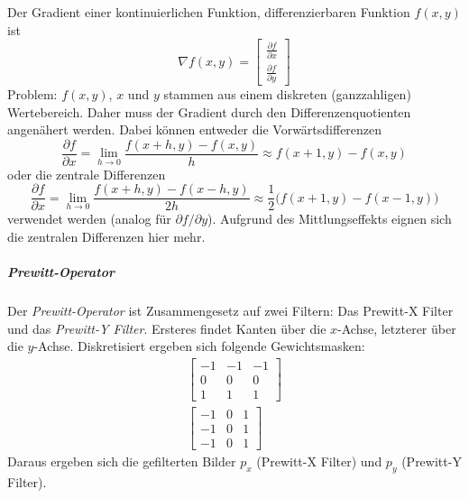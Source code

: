 \documentclass[a4paper, 11pt, accentcolor = tud3b]{tudreport}
\begin{document}
						Der Gradient einer kontinuierlichen Funktion, differenzierbaren Funktion \( f(x, y) \) ist
						\begin{equation*}
							\nabla f(x, y) =
								\begin{bmatrix}
									\frac{\partial f}{\partial x} \\
									\frac{\partial f}{\partial y}
								\end{bmatrix}
						\end{equation*}
						Problem: \( f(x, y) \), \(x\) und \(y\) stammen aus einem diskreten (ganzzahligen) Wertebereich. Daher muss der Gradient durch den Differenzenquotienten angenähert werden. Dabei können entweder die Vorwärtsdifferenzen
						\begin{equation*}
							\frac{\partial f}{\partial x} = \lim\limits_{h \to 0} \frac{f(x + h, y) - f(x, y)}{h} \approx f(x + 1, y) - f(x, y)
						\end{equation*}
						oder die zentrale Differenzen
						\begin{equation*}
							\frac{\partial f}{\partial x} = \lim\limits_{h \to 0} \frac{f(x + h, y) - f(x - h, y)}{2h} \approx \frac{1}{2} \big( f(x + 1, y) - f(x - 1, y) \big)
						\end{equation*}
						verwendet werden (analog für \( \partial f / \partial y \)). Aufgrund des Mittlungseffekts eignen sich die zentralen Differenzen hier mehr.

						\subparagraph{Prewitt-Operator} %
							Der \emph{Prewitt-Operator} ist Zusammengesetz auf zwei Filtern: Das Prewitt-X Filter und das \emph{Prewitt-Y Filter}. Ersteres findet Kanten über die \(x\)-Achse, letzterer über die \(y\)-Achse. Diskretisiert ergeben sich folgende Gewichtsmasken:
							\begin{gather*}
								\begin{bmatrix}
									-1 & -1 & -1 \\
									0  & 0  & 0  \\
									1  & 1  & 1
								\end{bmatrix} \tag{Prewitt-X Filter} \\
								\begin{bmatrix}
									-1 & 0 & 1 \\
									-1 & 0 & 1 \\
									-1 & 0 & 1
								\end{bmatrix} \tag{Prewitt-Y Filter}
							\end{gather*}
							Daraus ergeben sich die gefilterten Bilder \(p_x\) (Prewitt-X Filter) und \(p_y\) (Prewitt-Y Filter).
							
\end{document}
